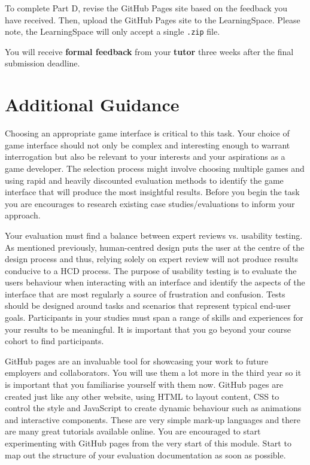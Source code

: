\documentclass{../fal_assignment}
\begin{document}
To complete Part D, revise the GitHub Pages site based on the feedback you have received. Then, upload the GitHub Pages site to the LearningSpace. Please note, the LearningSpace will only accept a single \texttt{.zip} file.

You will receive \textbf{formal feedback} from your \textbf{tutor} three weeks after the final submission deadline.

\section*{Additional Guidance}
Choosing an appropriate game interface is critical to this task. Your choice of game interface should not only be complex and interesting enough to warrant interrogation but also be relevant to your interests and your aspirations as a game developer. The selection process might involve choosing multiple games and using rapid and heavily discounted evaluation methods to identify the game interface that will produce the most insightful results. Before you begin the task you are encourages to research existing case studies/evaluations to inform your approach. 

Your evaluation must find a balance between expert reviews vs. usability testing. As mentioned previously, human-centred design puts the user at the centre of the design process and thus, relying solely on expert review will not produce results conducive to a HCD process. The purpose of usability testing is to evaluate the users behaviour when interacting with an interface and identify the aspects of the interface that are most regularly a source of frustration and confusion. Tests should be designed around tasks and scenarios that represent typical end-user goals. Participants in your studies must span a range of skills and experiences for your results to be meaningful. It is important that you go beyond your course cohort to find participants. 

GitHub pages are an invaluable tool for showcasing your work to future employers and collaborators. You will use them a lot more in the third year so it is important that you familiarise yourself with them now. GitHub pages are created just like any other website, using HTML to layout content, CSS to control the style and JavaScript to create dynamic behaviour such as animations and interactive components. These are very simple mark-up languages and there are many great tutorials available online. You are encouraged to start experimenting with GitHub pages from the very start of this module. Start to map out the structure of your evaluation documentation as soon as possible.  
\end{document}
